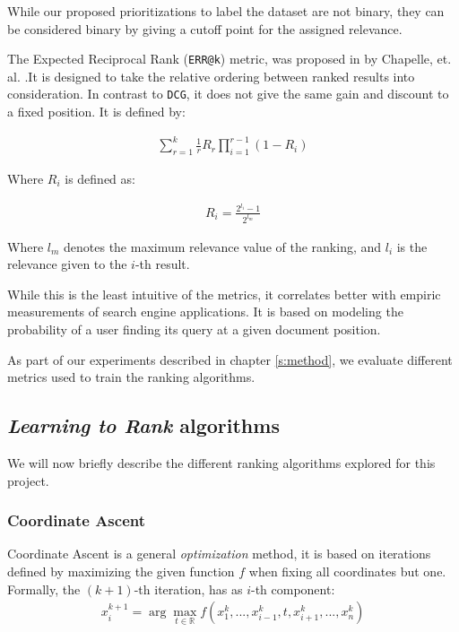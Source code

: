 While our proposed prioritizations to label the dataset are not binary,
they can be considered binary by giving a cutoff point for the assigned relevance.

The Expected Reciprocal Rank (\texttt{ERR@k}) metric, was proposed in \cite{10.1145/1645953.1646033}
by Chapelle, et. al. .It is designed to take the relative ordering between ranked results into consideration.
In contrast to \texttt{DCG}, it does not give the same gain and discount to a fixed position.
It is defined by:

\begin{align*}
\sum_{r=1}^k \frac{1}{r} R_r \prod_{i=1}^{r-1}(1-R_i)
\end{align*}

Where $R_i$ is defined as:

\begin{align*}
R_i = \frac{2^{l_i}-1}{2^{l_m}}
\end{align*}

Where $l_m$ denotes the maximum relevance value of the ranking, and $l_i$ is the relevance given to the $i$-th result.

While this is the least intuitive of the metrics, it correlates better with empiric measurements of search engine applications\cite{10.1145/1645953.1646033}.
It is based on modeling the probability of a user finding its query at a given document position.

As part of our experiments described in chapter \ref{s:method}, we evaluate different metrics
used to train the ranking algorithms. 

\subsection{\emph{Learning to Rank} algorithms}\label{s:bg-tsp-ltr-algs}

We will now briefly describe the different ranking algorithms explored for this project.

\subsubsection{Coordinate Ascent}
Coordinate Ascent is a general \textit{optimization} method, it is based on iterations defined
by maximizing the given function $f$ when fixing all coordinates but one. Formally, the $(k+1)$-th iteration,
has as $i$-th component:
\begin{align*}
x^{k+1}_i = \arg \max_{t\in\mathbb{R}} f(x^{k}_1, ..., x^{k}_{i-1}, t, x^{k}_{i+1}, ..., x^k_n)
\end{align*}

